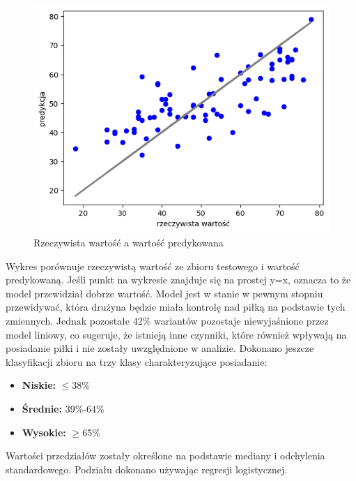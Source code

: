 \documentclass[11pt]{article}
\begin{document}
    
    \begin{figure}[hbt]
    \includegraphics[scale=0.40]{predict_real.png}
    \caption{Rzeczywista wartość a wartość predykowana}
    \end{figure}
    Wykres porównuje rzeczywistą wartość ze zbioru testowego i wartość predykowaną. Jeśli punkt na wykresie znajduje się na prostej y=x, oznacza to że model przewidział dobrze wartość.
    \newline
    \newline
    Model jest w stanie w pewnym stopniu przewidywać, która drużyna będzie miała kontrolę nad piłką na podstawie tych zmiennych. Jednak pozostałe 42\% wariantów pozostaje niewyjaśnione przez model liniowy, co sugeruje, że istnieją inne czynniki, które również wpływają na posiadanie piłki i nie zostały uwzględnione w analizie.
    \newline
    \newline
    Dokonano jeszcze klasyfikacji zbioru na trzy klasy charakteryzujące posiadanie:
    \begin{itemize}
    \item \textbf{Niskie:} $\leq$38\%
    \item \textbf{Średnie:} 39\%-64\%
    \item \textbf{Wysokie:} $\geq$65\%
    \end{itemize}
    Wartości przedziałów zostały określone na podstawie mediany i odchylenia standardowego.
    Podziału dokonano używając regresji logistycznej.
\end{document}
